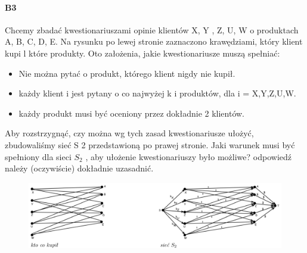 \documentclass[a4paper,12pt]{article}
\theoremstyle{definition}%
\theoremstyle{definition}
\theoremstyle{problem}
\begin{document}
\paragraph{B3} Chcemy zbadać kwestionariuszami opinie klientów X, Y , Z, U, W o produktach A, B, C, D, E. Na rysunku po lewej stronie zaznaczono krawędziami, który klient kupi l które produkty. Oto założenia, jakie kwestionariusze muszą spełniać:
\begin{itemize}
\item Nie można pytać o produkt, którego klient nigdy nie kupił.
\item każdy klient i jest pytany o co najwyżej k i produktów, dla i = X,Y,Z,U,W.
\item każdy produkt musi być oceniony przez dokładnie 2 klientów.
\end{itemize}
Aby rozstrzygnąć, czy można wg tych zasad kwestionariusze ułożyć, zbudowaliśmy sieć S 2 przedstawioną po prawej stronie. Jaki warunek musi być spełniony dla sieci $S_2$ , aby ułożenie kwestionariuszy było możliwe? odpowiedź należy (oczywiście) dokładnie uzasadnić.
\begin{figure}[H]
\centering
\includegraphics[width=.9\textwidth]{img/7_B3}
\end{figure}
\end{document}

